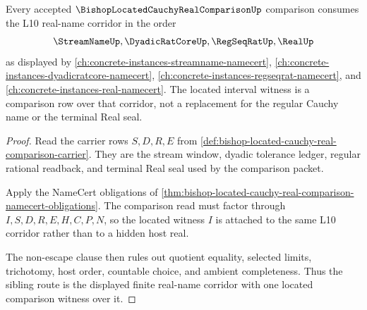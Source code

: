 \begin{theorem}
\label{thm:bishop-located-cauchy-real-comparison-sibling-route}
Every accepted $\BishopLocatedCauchyRealComparisonUp$ comparison consumes the L10 real-name corridor in the order
$$
\StreamNameUp,\DyadicRatCoreUp,\RegSeqRatUp,\RealUp
$$
as displayed by \autoref{ch:concrete-instances-streamname-namecert}, \autoref{ch:concrete-instances-dyadicratcore-namecert}, \autoref{ch:concrete-instances-regseqrat-namecert}, and \autoref{ch:concrete-instances-real-namecert}. The located interval witness is a comparison row over that corridor, not a replacement for the regular Cauchy name or the terminal Real seal.
\end{theorem}
\begin{proof}
Read the carrier rows $S,D,R,E$ from \autoref{def:bishop-located-cauchy-real-comparison-carrier}. They are the stream window, dyadic tolerance ledger, regular rational readback, and terminal Real seal used by the comparison packet.

Apply the NameCert obligations of \autoref{thm:bishop-located-cauchy-real-comparison-namecert-obligations}. The comparison read must factor through $I,S,D,R,E,H,C,P,N$, so the located witness $I$ is attached to the same L10 corridor rather than to a hidden host real.

The non-escape clause then rules out quotient equality, selected limits, trichotomy, host order, countable choice, and ambient completeness. Thus the sibling route is the displayed finite real-name corridor with one located comparison witness over it.
\end{proof}


\begin{closurestatus}{\BishopLocatedCauchyRealComparisonUp}
  \theoryclosure{\seedClosure}
  \formalstatus{\unformalizedV}
\end{closurestatus}
